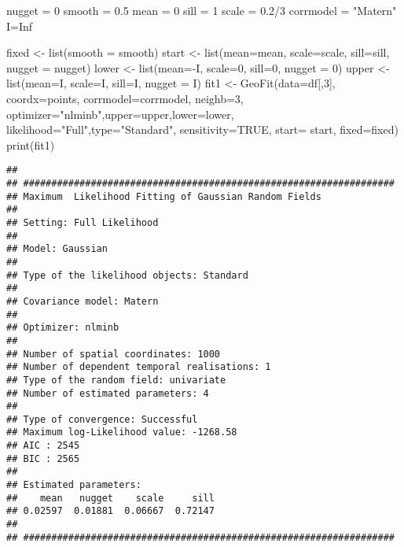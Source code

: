 \documentclass[
]{article}
\newenvironment{Shaded}{\begin{snugshade}}{\end{snugshade}}
\newcommand{\AttributeTok}[1]{\textcolor[rgb]{0.77,0.63,0.00}{#1}}
\newcommand{\ConstantTok}[1]{\textcolor[rgb]{0.00,0.00,0.00}{#1}}
\newcommand{\DecValTok}[1]{\textcolor[rgb]{0.00,0.00,0.81}{#1}}
\newcommand{\FloatTok}[1]{\textcolor[rgb]{0.00,0.00,0.81}{#1}}
\newcommand{\FunctionTok}[1]{\textcolor[rgb]{0.00,0.00,0.00}{#1}}
\newcommand{\NormalTok}[1]{#1}
\newcommand{\OtherTok}[1]{\textcolor[rgb]{0.56,0.35,0.01}{#1}}
\newcommand{\SpecialCharTok}[1]{\textcolor[rgb]{0.00,0.00,0.00}{#1}}
\newcommand{\StringTok}[1]{\textcolor[rgb]{0.31,0.60,0.02}{#1}}
\begin{document}
\begin{Shaded}
\begin{Highlighting}[]
\NormalTok{nugget }\OtherTok{=} \DecValTok{0}
\NormalTok{smooth }\OtherTok{=} \FloatTok{0.5}
\NormalTok{mean }\OtherTok{=} \DecValTok{0}
\NormalTok{sill }\OtherTok{=} \DecValTok{1}
\NormalTok{scale }\OtherTok{=} \FloatTok{0.2}\SpecialCharTok{/}\DecValTok{3}
\NormalTok{corrmodel }\OtherTok{=} \StringTok{"Matern"}
\NormalTok{I}\OtherTok{=}\ConstantTok{Inf}


\NormalTok{fixed }\OtherTok{\textless{}{-}} \FunctionTok{list}\NormalTok{(}\AttributeTok{smooth =}\NormalTok{ smooth)}
\NormalTok{start }\OtherTok{\textless{}{-}} \FunctionTok{list}\NormalTok{(}\AttributeTok{mean=}\NormalTok{mean, }\AttributeTok{scale=}\NormalTok{scale, }\AttributeTok{sill=}\NormalTok{sill, }\AttributeTok{nugget =}\NormalTok{ nugget)}
\NormalTok{lower }\OtherTok{\textless{}{-}} \FunctionTok{list}\NormalTok{(}\AttributeTok{mean=}\SpecialCharTok{{-}}\NormalTok{I, }\AttributeTok{scale=}\DecValTok{0}\NormalTok{, }\AttributeTok{sill=}\DecValTok{0}\NormalTok{, }\AttributeTok{nugget =} \DecValTok{0}\NormalTok{)}
\NormalTok{upper }\OtherTok{\textless{}{-}} \FunctionTok{list}\NormalTok{(}\AttributeTok{mean=}\NormalTok{I, }\AttributeTok{scale=}\NormalTok{I, }\AttributeTok{sill=}\NormalTok{I, }\AttributeTok{nugget =}\NormalTok{ I)}
\NormalTok{fit1  }\OtherTok{\textless{}{-}} \FunctionTok{GeoFit}\NormalTok{(}\AttributeTok{data=}\NormalTok{df[,}\DecValTok{3}\NormalTok{], }\AttributeTok{coordx=}\NormalTok{points, }\AttributeTok{corrmodel=}\NormalTok{corrmodel, }\AttributeTok{neighb=}\DecValTok{3}\NormalTok{,}
                    \AttributeTok{optimizer=}\StringTok{"nlminb"}\NormalTok{,}\AttributeTok{upper=}\NormalTok{upper,}\AttributeTok{lower=}\NormalTok{lower,}
                    \AttributeTok{likelihood=}\StringTok{"Full"}\NormalTok{,}\AttributeTok{type=}\StringTok{"Standard"}\NormalTok{, }\AttributeTok{sensitivity=}\ConstantTok{TRUE}\NormalTok{,}
                    \AttributeTok{start=}\NormalTok{ start, }\AttributeTok{fixed=}\NormalTok{fixed)}
\FunctionTok{print}\NormalTok{(fit1)}
\end{Highlighting}
\end{Shaded}

\begin{verbatim}
## 
## ##################################################################
## Maximum  Likelihood Fitting of Gaussian Random Fields
## 
## Setting: Full Likelihood 
## 
## Model: Gaussian 
## 
## Type of the likelihood objects: Standard 
## 
## Covariance model: Matern 
## 
## Optimizer: nlminb 
## 
## Number of spatial coordinates: 1000 
## Number of dependent temporal realisations: 1 
## Type of the random field: univariate 
## Number of estimated parameters: 4 
## 
## Type of convergence: Successful 
## Maximum log-Likelihood value: -1268.58
## AIC : 2545 
## BIC : 2565 
## 
## Estimated parameters:
##    mean   nugget    scale     sill  
## 0.02597  0.01881  0.06667  0.72147  
## 
## ##################################################################
\end{verbatim}
\end{document}
